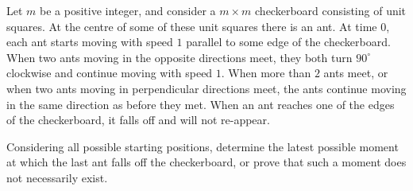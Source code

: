 Let 
$m$
 be a positive integer, and consider a 
$m\times m$
 checkerboard consisting of unit squares. At the centre of some of these unit squares there is an ant. At time 
$0$, 
 each ant starts moving with speed 
$1$
 parallel to some edge of the checkerboard. When two ants moving in the opposite directions meet, they both turn 
$90^{\circ}$
 clockwise and continue moving with speed 
$1$.
 When more than 
$2$
 ants meet, or when two ants moving in perpendicular directions meet, the ants continue moving in the same direction as before they met. When an ant reaches one of the edges of the checkerboard, it falls off and will not re-appear.


Considering all possible starting positions, determine the latest possible moment at which the last ant falls off the checkerboard, or prove that such a moment does not necessarily exist.
